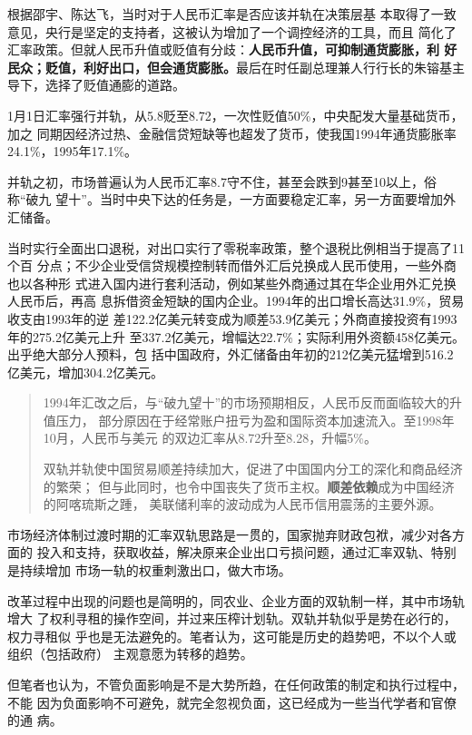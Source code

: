 根据邵宇、陈达飞\cite{huilv70binggui}，当时对于人民币汇率是否应该并轨在决策层基
本取得了一致意见，央行是坚定的支持者，这被认为增加了一个调控经济的工具，而且
简化了汇率政策。但就人民币升值或贬值有分歧：\textbf{人民币升值，可抑制通货膨胀，利
  好民众；贬值，利好出口，但会通货膨胀。}最后在时任副总理兼人行行长的朱镕基主
导下，选择了贬值通膨的道路。

1月1日汇率强行并轨，从5.8贬至8.72，一次性贬值50\%，中央配发大量基础货币，加之
同期因经济过热、金融信贷短缺等也超发了货币，使我国1994年通货膨胀率24.1\%，1995年17.1\%。

并轨之初，市场普遍认为人民币汇率8.7守不住，甚至会跌到9甚至10以上，俗称“破九
望十”。当时中央下达的任务是，一方面要稳定汇率，另一方面要增加外汇储备。

当时实行全面出口退税，对出口实行了零税率政策，整个退税比例相当于提高了11个百
分点；不少企业受信贷规模控制转而借外汇后兑换成人民币使用，一些外商也以各种形
式进入国内进行套利活动，例如某些外商通过其在华企业用外汇兑换人民币后，再高
息拆借资金短缺的国内企业。1994年的出口增长高达31.9\%，贸易收支由1993年的逆
差122.2亿美元转变成为顺差53.9亿美元；外商直接投资有1993年的275.2亿美元上升
至337.2亿美元，增幅达22.7\%；实际利用外资额458亿美元。出乎绝大部分人预料，包
括中国政府，外汇储备由年初的212亿美元猛增到516.2亿美元，增加304.2亿美元。
\begin{quotation}
  1994年汇改之后，与“破九望十”的市场预期相反，人民币反而面临较大的升值压力，
  部分原因在于经常账户扭亏为盈和国际资本加速流入。至1998年10月，人民币与美元
  的双边汇率从8.72升至8.28，升幅5\%。\cite{huilv70binggui}

  双轨并轨使中国贸易顺差持续加大，促进了中国国内分工的深化和商品经济的繁荣；
  但与此同时，也令中国丧失了货币主权。\textbf{顺差依赖}成为中国经济的阿喀琉斯之踵，
  美联储利率的波动成为人民币信用震荡的主要外源。\cite{dajueqi}
\end{quotation}

市场经济体制过渡时期的汇率双轨思路是一贯的，国家抛弃财政包袱，减少对各方面的
投入和支持，获取收益，解决原来企业出口亏损问题，通过汇率双轨、特别是持续增加
市场一轨的权重刺激出口，做大市场。


改革过程中出现的问题也是简明的，同农业、企业方面的双轨制一样，其中市场轨增大
了权利寻租的操作空间，并过来压榨计划轨。双轨并轨似乎是势在必行的，权力寻租似
乎也是无法避免的。笔者认为，这可能是历史的趋势吧，不以个人或组织（包括政府）
主观意愿为转移的趋势。

但笔者也认为，不管负面影响是不是大势所趋，在任何政策的制定和执行过程中，不能
因为负面影响不可避免，就完全忽视负面，这已经成为一些当代学者和官僚的通
病。

